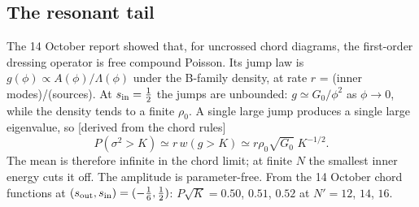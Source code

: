 \documentclass[11pt]{article}
\newcommand{\Np}{N'}
\newcommand{\tagbox}[2]{\textsf{\small\color{#1}[#2]}}
\newcommand{\CHORD}{\tagbox{cder}{derived from the chord rules}}
\theoremstyle{plain}
\theoremstyle{remark}
\numberwithin{equation}{section}
\begin{document}
\subsection{The resonant tail}
The 14 October report showed that, for uncrossed chord diagrams, the first-order dressing operator is free compound Poisson.
Its jump law is $g(\phi)\propto A(\phi)/\Lambda(\phi)$ under the B-family density, at rate $r$ = (inner modes)/(sources).
At $s_{\rm in}=\tfrac12$ the jumps are unbounded: $g\simeq G_0/\phi^2$ as $\phi\to0$, while the density tends to a finite
$\rho_0$. A single large jump produces a single large eigenvalue, so \CHORD
\begin{equation}\label{eq:tail}
P(\sigma^2>K)\simeq r\,w(g>K)\simeq r\rho_0\sqrt{G_0}\;K^{-1/2}.
\end{equation}
The mean is therefore infinite in the chord limit; at finite $N$ the smallest inner energy cuts it off. The amplitude
is parameter-free. From the 14 October chord functions at $(s_{\rm out},s_{\rm in})=(-\tfrac16,\tfrac12)$:
$P\sqrt K=0.50$, $0.51$, $0.52$ at $\Np=12$, $14$, $16$.
\end{document}
